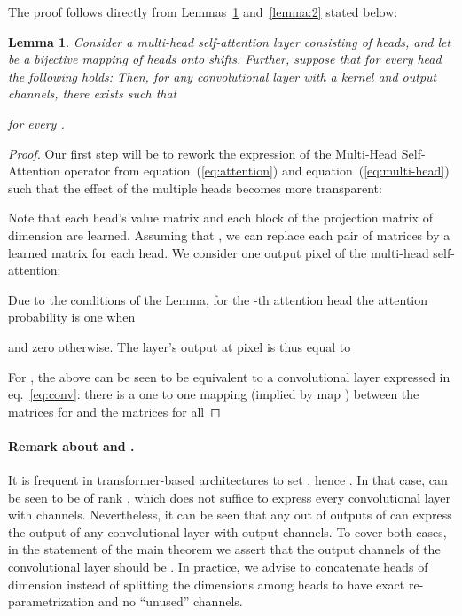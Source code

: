 \documentclass{article} \usepackage{iclr2020_conference,times}
\def\eqref#1{equation~(\ref{#1})}
\newtheorem{lemma}{Lemma}
\begin{document}
The proof follows directly from Lemmas~\ref{lemma:1} and~\ref{lemma:2} stated below:



\begin{lemma}
Consider a multi-head self-attention layer consisting of  heads,  and let  be a bijective mapping of heads onto shifts. Further, suppose that for every head the following holds: 
Then, for any convolutional layer with a  kernel and  output channels, there exists  such that

for every .\label{lemma:1}
\end{lemma}

\begin{proof}
Our first step will be to rework the expression of the Multi-Head Self-Attention operator from  \eqref{eq:attention} and \eqref{eq:multi-head} such that the effect of the multiple heads becomes more transparent:

Note that each head's value matrix  and each block of the projection matrix  of dimension  are learned.
Assuming that , we can replace each pair of matrices by a learned matrix  for each head.
We consider one output pixel of the multi-head self-attention:

Due to the conditions of the Lemma, for the -th attention head the attention probability is one when

and zero otherwise.
The layer's output at pixel  is thus equal to

For , the above can be seen to be equivalent to a convolutional layer expressed in eq.~\ref{eq:conv}: there is a one to one mapping (implied by map ) between the matrices  for  and the matrices  for all 
\end{proof}

\paragraph{Remark about  and .}
It is frequent in transformer-based architectures to set , hence . In that case,  can be seen to be of rank , which does not suffice to express every convolutional layer with  channels. Nevertheless, it can be seen that any  out of  outputs of  can express the output of any convolutional layer with  output channels. To cover both cases, in the statement of the main theorem we assert that the output channels of the convolutional layer should be . In practice, we advise to concatenate heads of dimension  instead of splitting the  dimensions among heads to have exact re-parametrization and no ``unused'' channels.
\end{document}
